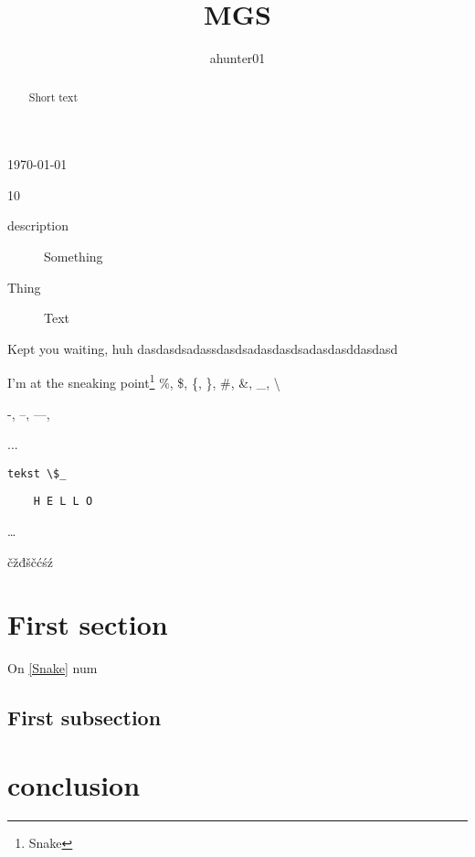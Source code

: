 \documentclass[a4paper, 12pt]{article}
\title{MGS}
\author{ahunter01}
\begin{document}
\maketitle
\tableofcontents
\today

\begin{abstract}
    Short text
\end{abstract}

10
\begin{description}
    \item[description] Something
    \item[Thing] Text
\end{description}

Kept you waiting, huh
dasdasdsadassdasdsadasdasdsadasdasd\-dasdasd

I'm at the sneaking point\footnote{Snake}
\label{Snake}
\%, \$, \{, \}, \#, \&, \_, \textbackslash{}

-, --, ---,

... 

\verb|tekst \$_|


\begin{verbatim}
    H E L L O
\end{verbatim}
\ldots 

čžđščćśź

\section{First section}
On \ref{Snake} num \pageref{Snake}
    \subsection{First subsection}
\section*{conclusion}
\end{document}
